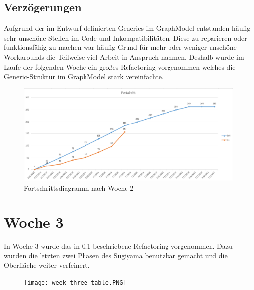 \subsection{Verzögerungen}
\label{sec:delay_week2}
Aufgrund der im Entwurf definierten Generics im GraphModel entstanden häufig sehr unschöne Stellen im Code und Inkompatibilitäten. Diese zu reparieren oder funktionsfähig zu machen war häufig Grund für mehr oder weniger unschöne Workarounds die Teilweise viel Arbeit in Anspruch nahmen. Deshalb wurde im Laufe der folgenden Woche ein großes Refactoring vorgenommen welches die Generic-Struktur im GraphModel stark vereinfachte.

\begin{figure}[!htbp]
	\centering
	\includegraphics[width=380pt]{resourcen/week_two_diagram.PNG}
	\caption{Fortschrittsdiagramm nach Woche 2}
	\label{fig:week_two_diagram}
\end{figure}

\section{Woche 3}
In Woche 3 wurde das in \ref{sec:delay_week2} beschriebene Refactoring vorgenommen. Dazu wurden die letzten zwei Phasen des Sugiyama benutzbar gemacht und die Oberfläche weiter verfeinert.
\begin{figure}[!htbp]
	\centering
	\texttt{[image: week\_three\_table.PNG]}
	\caption{}
	\label{fig:week_three_table}
\end{figure}

